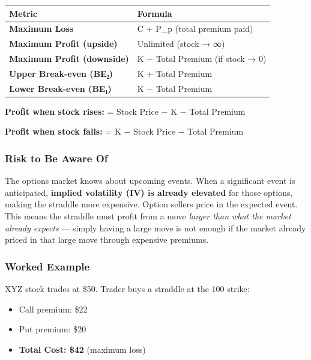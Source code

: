 \documentclass[12pt,openany]{book}
\begin{document}
\begin{center}
\scriptsize
\setlength{\tabcolsep}{3pt}
\begin{tabular}{|L{6.00cm}|L{6.00cm}|}
\hline
Metric & Formula \\
\hline
\textbf{Maximum Loss} & C + P\_p (total premium paid) \\
\hline
\textbf{Maximum Profit (upside)} & Unlimited (stock → ∞) \\
\hline
\textbf{Maximum Profit (downside)} & K − Total Premium (if stock → 0) \\
\hline
\textbf{Upper Break-even (BE₂)} & K + Total Premium \\
\hline
\textbf{Lower Break-even (BE₁)} & K − Total Premium \\
\hline
\end{tabular}
\end{center}

\textbf{Profit when stock rises:} = Stock Price − K − Total Premium

\textbf{Profit when stock falls:} = K − Stock Price − Total Premium



\subsubsection{Risk to Be Aware Of}

The options market knows about upcoming events. When a significant event is anticipated, \textbf{implied volatility (IV) is already elevated} for those options, making the straddle more expensive. Option sellers price in the expected event. This means the straddle must profit from a move \emph{larger than what the market already expects} — simply having a large move is not enough if the market already priced in that large move through expensive premiums.



\subsubsection{Worked Example}

XYZ stock trades at \$50. Trader buys a straddle at the 100 strike:
\begin{itemize}[leftmargin=*]
    \item Call premium: \$22
    \item Put premium: \$20
    \item \textbf{Total Cost: \$42} (maximum loss)
\end{itemize}
\end{document}
